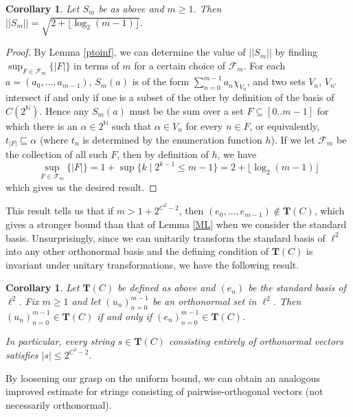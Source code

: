 \documentclass{article}
\newtheorem{corollary}[theorem]{Corollary}
\newcommand{\N}{\mathbb N}
\newcommand{\floor}[1]{\lfloor #1 \rfloor}
\begin{document}
\begin{corollary}\label{basicvectorestimate}
Let $S_m$ be as above and $m\geq 1$. Then $||S_m|| = \sqrt{2+\floor{\log_2(m-1)}}$.
\end{corollary}

\begin{proof}
By Lemma \ref{ptoinf}, we can determine the value of $||S_m||$ by finding $\sup_{F\in\mathcal F_m}\{|F|\}$ in terms of $m$ for a certain choice of $\mathcal F_m$. For each $a = (a_0,\ldots, a_{m-1})$, $S_m(a)$ is of the form $\sum_{n=0}^{m-1} a_n\chi_{V_n}$, and two sets $V_{n}$, $V_{n'}$ intersect if and only if one is a subset of the other by definition of the basis of $C(2^\N)$. Hence any $S_m(a)$ must be the sum over a set $F\subseteq[0..m-1]$ for which there is an $\alpha\in 2^\N$ such that $\alpha\in V_n$ for every $n\in F$, or equivalently, $t_{|F|}\sqsubseteq \alpha$ (where $t_n$ is determined by the enumeration function $h$). If we let $\mathcal F_m$ be the collection of all such $F$, then by definition of $h$, we have
\begin{equation*}
\sup_{F\in \mathcal F_m}\{|F|\} = 1+\sup\{k\mid 2^{k-1}\leq m-1\} = 2 + \floor{\log_2(m-1)}
\end{equation*}
which gives us the desired result.
\end{proof}

This result tells us that if $m > 1+2^{C^2-2}$, then $(e_0,\ldots, e_{m-1})\notin \textbf{T}(C)$, which gives a stronger bound than that of Lemma \ref{ML} when we consider the standard basis.  Unsurprisingly, since we can unitarily transform the standard basis of $\ell^2$ into any other orthonormal basis and the defining condition of $\textbf{T}(C)$ is invariant under unitary transformations, we have the following result.

\begin{corollary}\label{reorder}
Let $\textbf{T}(C)$ be defined as above and $(e_n)$ be the standard basis of $\ell^2$. Fix $m\geq 1$ and let $(u_n)_{n=0}^{m-1}$ be an orthonormal set in $\ell^2$. Then $(u_n)_{n=0}^{m-1}\in \textbf{T}(C)$ if and only if $(e_n)_{n=0}^{m-1}\in \textbf{T}(C)$. 

 In particular, every string $s\in \textbf{T}(C)$ consisting entirely of orthonormal vectors satisfies $|s|\leq 2^{C^2-2}$.
\end{corollary}

By loosening our grasp on the uniform bound, we can obtain an analogous improved estimate for strings consisting of pairwise-orthogonal vectors (not necessarily orthonormal).
\end{document}
